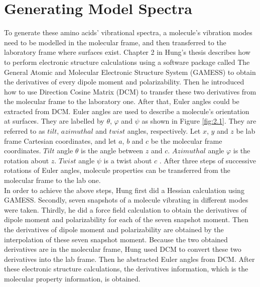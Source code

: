 \section{Generating Model Spectra \cite{ss}}
To generate these amino acids' vibrational spectra, a molecule's vibration modes need to be modelled in the molecular frame, and then transferred to the laboratory frame where surfaces exist. Chapter 2 in Hung's thesis \cite{KuoKaiHung:Thesis:2015} describes how to perform electronic structure calculations using a software package called The General Atomic and Molecular Electronic Structure System (GAMESS) \cite{GAMESS} to obtain the derivatives of every dipole moment and polarizability. Then he introduced how to use Direction Cosine Matrix (DCM) to transfer these two derivatives from the molecular frame to the laboratory one. After that, Euler angles could be extracted from DCM. Euler angles are used to describe a molecule's orientation at surfaces. They are labelled by $\theta$, $\varphi$ and $\psi$ as shown in Figure \ref{fig:2.1}. They are referred to as $tilt$, $azimuthal$ and $twist$ angles, respectively. Let $x$, $y$ and $z$ be lab frame Cartesian coordinates, and let $a$, $b$ and $c$ be the molecular frame coordinates. $Tilt$ angle $\theta$ is the angle between $z$ and $c$. $Azimuthal$ angle $\varphi$ is the rotation about $z$. $Twist$ angle $\psi$ is a twist about $c$ \cite{hore0033-rotations}. After three steps of successive rotations of Euler angles, molecule properties can be transferred from the molecular frame to the lab one. \\

In order to achieve the above steps, Hung first did a Hessian calculation using GAMESS. Secondly, seven snapshots of a molecule vibrating in different modes were taken. Thirdly, he did a force field calculation to obtain the derivatives of dipole moment and polarizability for each of the seven snapshot moment. Then the derivatives of dipole moment and polarizability are obtained by the interpolation of these seven snapshot moment. Because the two obtained derivatives are in the molecular frame, Hung used DCM to convert these two derivatives into the lab frame. Then he abstracted Euler angles from DCM. After these electronic structure calculations, the derivatives information, which is the molecular property information, is obtained. \\

